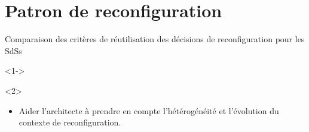 \section{Patron de reconfiguration}

%
\begin{frame}{Comparaison des critères de réutilisation des décisions de reconfiguration
pour les SdSs}
\begin{onlyenv}<1->
\begin{table}[]
\renewcommand{\arraystretch}{2}
\end{table}
\end{onlyenv}
\begin{onlyenv}<2>
\begin{block}{}
\begin{itemize}
    \item Aider l'architecte à prendre en compte l'hétérogénéité et l'évolution du contexte de reconfiguration.
\end{itemize}
\end{block}
\end{onlyenv}
\end{frame}

